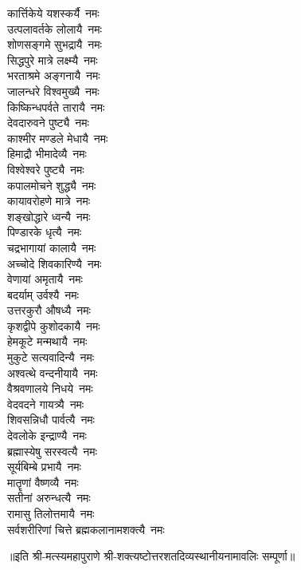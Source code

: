 \begin{multicols}{2}
\begin{flushleft}
कार्त्तिकेये यशस्कर्यै~नमः\\
उत्पलावर्तके लोलायै~नमः\\
शोणसङ्गमे सुभद्रायै~नमः\\
सिद्धपुरे मात्रे लक्ष्म्यै~नमः\\
भरताश्रमे अङ्गनायै~नमः\\
जालन्धरे विश्वमुख्यै~नमः\hfill{}\\
किष्किन्धपर्वते तारायै~नमः\\
देवदारुवने पुष्ट्यै~नमः\\
काश्मीर मण्डले मेधायै~नमः\\
हिमाद्रौ भीमादेव्यै~नमः\\
विश्वेश्वरे पुष्ट्यै~नमः\\
कपालमोचने शुद्ध्यै~नमः\\
कायावरोहणे मात्रे~नमः\\
शङ्खोद्धारे ध्वन्यै~नमः\\
पिण्डारके धृत्यै~नमः\\
चद्रभागायां कालायै~नमः\hfill{}\\
अच्चोदे शिवकारिण्यै~नमः\\
वेणायां अमृतायै~नमः\\
बदर्याम् उर्वश्यै~नमः\\
उत्तरकुरौ औषध्यै~नमः\\
कृशद्वीपे कुशोदकायै~नमः\\
हेमकूटे मन्मथायै~नमः\\
मुकुटे सत्यवादिन्यै~नमः\\
अश्वत्थे वन्दनीयायै~नमः\\
वैश्रवणालये निधये~नमः\\
वेदवदने गायत्र्यै~नमः\hfill{}\\
शिवसन्निधौ पार्वत्यै~नमः\\
देवलोके इन्द्राण्यै~नमः\\
ब्रह्मास्येषु सरस्वत्यै~नमः\\
सूर्यबिम्बे प्रभायै~नमः\\
मातॄणां वैष्णव्यै~नमः\\
सतीनां अरुन्धत्यै~नमः\\
रामासु तिलोत्तमायै~नमः\\
सर्वशरीरिणां चित्ते ब्रह्मकलानामशक्त्यै~नमः\\
\end{flushleft}
\end{multicols}
॥इति श्री-मत्स्यमहापुराणे श्री-शक्त्यष्टोत्तर\-शतदिव्यस्थानीयनामावलिः सम्पूर्णा॥
